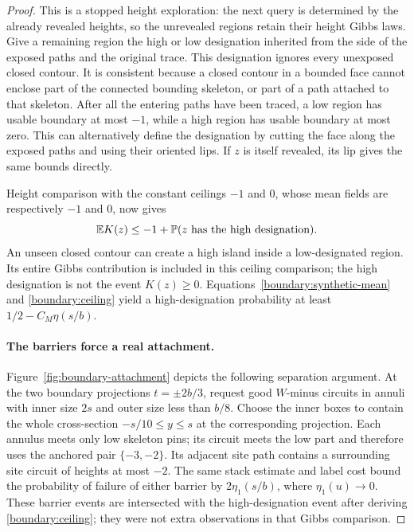 \documentclass[11pt]{article}
\theoremstyle{definition}
\theoremstyle{remark}
\numberwithin{equation}{section}
\begin{document}
\begin{proof}
This is a stopped height exploration: the next query is determined
by the already revealed heights, so the unrevealed regions retain
their height Gibbs laws.  Give a remaining region the high or low
designation inherited from the side of the exposed paths and the
original trace.  This designation ignores every unexposed closed
contour.  It is consistent because a closed contour in a bounded
face cannot enclose part of the connected bounding skeleton, or
part of a path attached to that skeleton.  After all the entering
paths have been traced, a low region has usable boundary at most
$-1$, while a high region has usable boundary at most zero.  This
can alternatively define the designation by cutting the face along
the exposed paths and using their oriented lips.  If $z$ is itself
revealed, its lip gives the same bounds directly.

Height comparison with the constant ceilings $-1$ and $0$, whose
mean fields are respectively $-1$ and $0$, now gives
\begin{equation}
 \mathbb E K(z)\le -1+\mathbb P(z\hbox{ has the high designation}).
 \label{boundary:ceiling}
\end{equation}
An unseen closed contour can create a high island inside a
low-designated region.  Its entire Gibbs contribution is included
in this ceiling comparison; the high designation is not the event
$K(z)\ge0$.  Equations~\eqref{boundary:synthetic-mean} and
\eqref{boundary:ceiling} yield a high-designation probability at
least $1/2-C_M\eta(s/b)$.

\paragraph{The barriers force a real attachment.}
Figure~\ref{fig:boundary-attachment} depicts the following separation
argument.
At the two boundary projections $t=\pm2b/3$, request good $W$-minus
circuits in annuli with inner size $2s$ and outer size less than
$b/8$.  Choose the inner boxes to contain the whole cross-section
$-s/10\le y\le s$ at the corresponding projection.  Each annulus
meets only low skeleton pins; its circuit meets the low part and
therefore uses the anchored pair $\{-3,-2\}$.  Its adjacent site
path contains a surrounding site circuit of heights at most $-2$.
The same stack estimate and label cost bound the probability of
failure of either barrier by $2\eta_1(s/b)$, where
$\eta_1(u)\to0$.  These barrier events are intersected with the
high-designation event after deriving \eqref{boundary:ceiling}; they
were not extra observations in that Gibbs comparison.


\end{proof}
\end{document}
